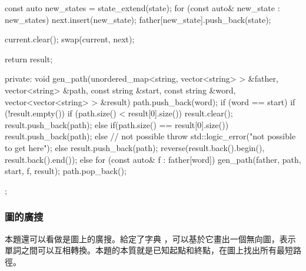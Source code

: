 \begin{Code}
{{{{                const auto new_states = state_extend(state);
                for (const auto& new_state : new_states) {
                    next.insert(new_state);
                    father[new_state].push_back(state);
                }
            }

            current.clear();
            swap(current, next);
        }

        return result;
    }
private:
    void gen_path(unordered_map<string, vector<string> > &father,
            vector<string> &path, const string &start, const string &word,
            vector<vector<string> > &result) {
        path.push_back(word);
        if (word == start) {
            if (!result.empty()) {
                if (path.size() < result[0].size()) {
                    result.clear();
                    result.push_back(path);
                } else if(path.size() == result[0].size()) {
                    result.push_back(path);
                } else {
                    // not possible
                    throw std::logic_error("not possible to get here");
                }
            } else {
                result.push_back(path);
            }
            reverse(result.back().begin(), result.back().end());
        } else {
            for (const auto& f : father[word]) {
                gen_path(father, path, start, f, result);
            }
        }
        path.pop_back();
    }
};
\end{Code}


\subsubsection{圖的廣搜}

本題還可以看做是圖上的廣搜。給定了字典 ，可以基於它畫出一個無向圖，表示單詞之間可以互相轉換。本題的本質就是已知起點和終點，在圖上找出所有最短路徑。

